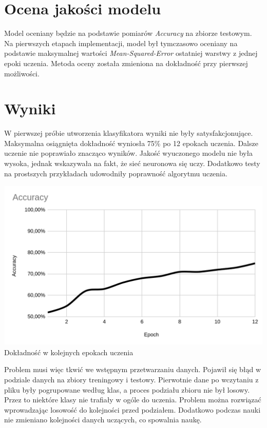 \documentclass[a4paper,12pt]{article}
\begin{document}
\section{Ocena jakości modelu}
\hspace{1cm}Model oceniany będzie na podstawie pomiarów \textsl{Accuracy} na zbiorze testowym. Na pierwszych etapach implementacji, model był tymczasowo oceniany na podstawie maksymalnej wartości \textsl{Mean-Squared-Error} ostatniej warstwy z jednej epoki uczenia. Metoda oceny została zmieniona na dokładność przy pierwszej możliwości.

\section{Wyniki}
\hspace{1cm}W pierwszej próbie utworzenia klasyfikatora wyniki nie były satysfakcjonujące. Maksymalna osiągnięta dokładność wyniosła 75\% po 12 epokach uczenia. Dalsze uczenie nie poprawiało znacząco wyników. Jakość wyuczonego modelu nie była wysoka, jednak wskazywała na fakt, że sieć neuronowa się uczy. Dodatkowo testy na prostszych przykładach udowodniły poprawność algorytmu uczenia.

\begin{center}
	\includegraphics[scale=0.25]{accuracy1.png}
	\\\small Dokładność w kolejnych epokach uczenia
\end{center}

\hspace{1cm}Problem musi więc tkwić we wstępnym przetwarzaniu danych. Pojawił się błąd w podziale danych na zbiory treningowy i testowy. Pierwotnie dane po wczytaniu z pliku były pogrupowane według klas, a proces podziału zbioru nie był losowy. Przez to niektóre klasy nie trafiały w ogóle do uczenia. Problem można rozwiązać wprowadzając losowość do kolejności przed podziałem. Dodatkowo podczas nauki nie zmieniano kolejności danych uczących, co spowalnia naukę.
\end{document}
